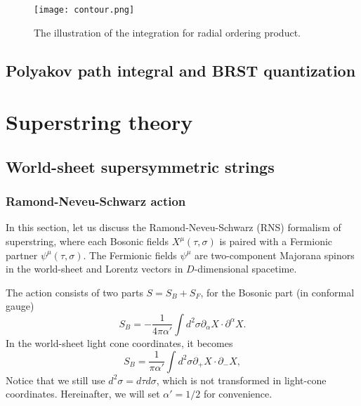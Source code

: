 \documentclass[graybox,envcountchap,sectrefs]{svmono}
\begin{document}
\begin{figure}
  \centering
  \texttt{[image: contour.png]}\\
\caption{The illustration of the integration for radial ordering product.}
\label{fig:radialquan}
\end{figure}


\chapter{Polyakov path integral and BRST quantization}



\part{Superstring theory}


\chapter{World-sheet supersymmetric strings}


\section{Ramond-Neveu-Schwarz action}
In this section, let us discuss the Ramond-Neveu-Schwarz (RNS) formalism of superstring, where each Bosonic fields $X^{\mu}(\tau,\sigma)$ is paired with a Fermionic partner $\psi^{\mu}(\tau,\sigma)$. The Fermionic fields $\psi^{\mu}$ are two-component Majorana spinors in the world-sheet and Lorentz vectors in $D$-dimensional spacetime.

The action consists of two parts $S=S_B+S_F$, for the Bosonic part (in conformal gauge)
\begin{equation}
S_B=-\frac{1}{4\pi \alpha'}\int d^2\sigma \partial_{\alpha}X\cdot \partial^{\alpha}X.	
\end{equation}
In the world-sheet light cone coordinates, it becomes
\begin{equation}
S_B=\frac{1}{\pi \alpha'}\int d^2\sigma \partial_{+}X\cdot \partial_{-}X	,
\end{equation}
Notice that we still use $d^2\sigma =d\tau d\sigma$, which is not transformed in light-cone coordinates.  Hereinafter, we will set $\alpha'=1/2$ for convenience.
\end{document}
